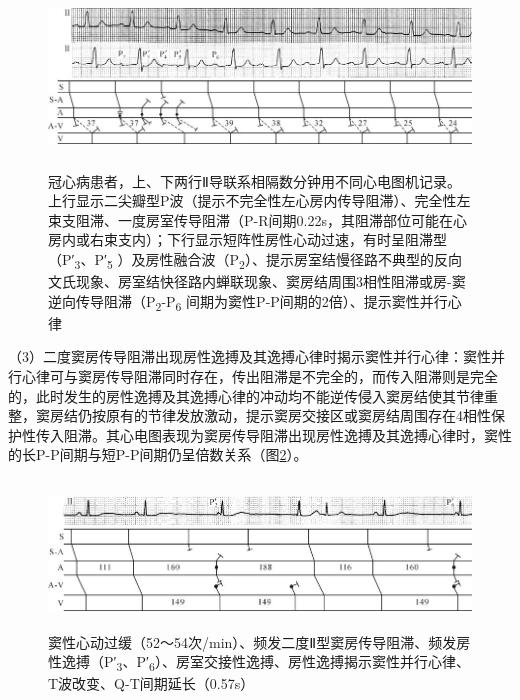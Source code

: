 \begin{figure}[!htbp]
 \centering
 \includegraphics[width=5.91667in,height=1.89583in]{./images/Image00575.jpg}
 \captionsetup{justification=centering}
 \caption{冠心病患者，上、下两行Ⅱ导联系相隔数分钟用不同心电图机记录。上行显示二尖瓣型P波（提示不完全性左心房内传导阻滞）、完全性左束支阻滞、一度房室传导阻滞（P-R间期0.22s，其阻滞部位可能在心房内或右束支内）；下行显示短阵性房性心动过速，有时呈阻滞型（P′\textsubscript{3}、P′\textsubscript{5} ）及房性融合波（P\textsubscript{2}）、提示房室结慢径路不典型的反向文氏现象、房室结快径路内蝉联现象、窦房结周围3相性阻滞或房-窦逆向传导阻滞（P\textsubscript{2}-P\textsubscript{6} 间期为窦性P-P间期的2倍）、提示窦性并行心律}
 \label{fig36-3}
  \end{figure} 


（3）二度窦房传导阻滞出现房性逸搏及其逸搏心律时揭示窦性并行心律：窦性并行心律可与窦房传导阻滞同时存在，传出阻滞是不完全的，而传入阻滞则是完全的，此时发生的房性逸搏及其逸搏心律的冲动均不能逆传侵入窦房结使其节律重整，窦房结仍按原有的节律发放激动，提示窦房交接区或窦房结周围存在4相性保护性传入阻滞。其心电图表现为窦房传导阻滞出现房性逸搏及其逸搏心律时，窦性的长P-P间期与短P-P间期仍呈倍数关系（图\ref{fig36-4}）。

\begin{figure}[!htbp]
 \centering
 \includegraphics[width=5.79167in,height=1.55208in]{./images/Image00576.jpg}
 \captionsetup{justification=centering}
 \caption{窦性心动过缓（52～54次/min）、频发二度Ⅱ型窦房传导阻滞、频发房性逸搏（P′\textsubscript{3}、P′\textsubscript{6}）、房室交接性逸搏、房性逸搏揭示窦性并行心律、T波改变、Q-T间期延长（0.57s）}
 \label{fig36-4}
  \end{figure} 


